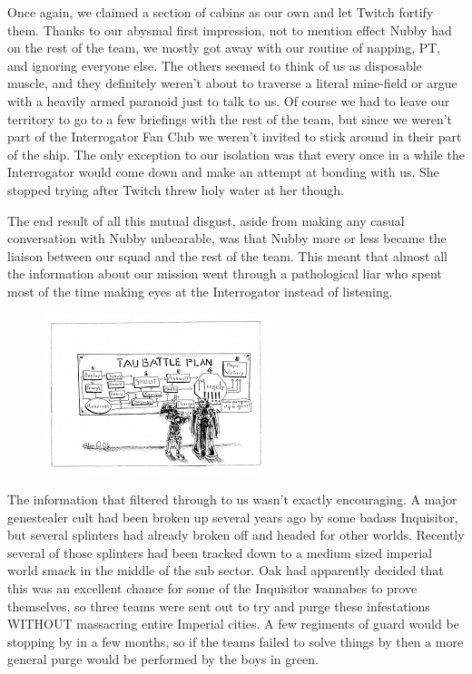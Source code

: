 Once again, we claimed a section of cabins as our own and let Twitch fortify them. 
Thanks to our abysmal first impression, not to mention effect Nubby had on the rest of the team, we mostly got away with our routine of napping, PT, and ignoring everyone else. 
The others seemed to think of us as disposable muscle, and they definitely weren’t about to traverse a literal mine-field or argue with a heavily armed paranoid just to talk to us. 
Of course we had to leave our territory to go to a few briefings with the rest of the team, but since we weren’t part of the Interrogator Fan Club we weren’t invited to stick around in their part of the ship. 
The only exception to our isolation was that every once in a while the Interrogator would come down and make an attempt at bonding with us. 
She stopped trying after Twitch threw holy water at her though.

The end result of all this mutual disgust, aside from making any casual conversation with Nubby unbearable, was that Nubby more or less became the liaison between our squad and the rest of the team. 
This meant that almost all the information about our mission went through a pathological liar who spent most of the time making eyes at the Interrogator instead of listening.

\begin{figure}
	\begin{center}
		\includegraphics[width=\figwidth]{pics/5/5.png}
	\end{center}
\end{figure}
The information that filtered through to us wasn’t exactly encouraging. 
A major genestealer cult had been broken up several years ago by some badass Inquisitor, but several splinters had already broken off and headed for other worlds. 
Recently several of those splinters had been tracked down to a medium sized imperial world smack in the middle of the sub sector. 
Oak had apparently decided that this was an excellent chance for some of the Inquisitor wannabes to prove themselves, so three teams were sent out to try and purge these infestations WITHOUT massacring entire Imperial cities. 
A few regiments of guard would be stopping by in a few months, so if the teams failed to solve things by then a more general purge would be performed by the boys in green.

